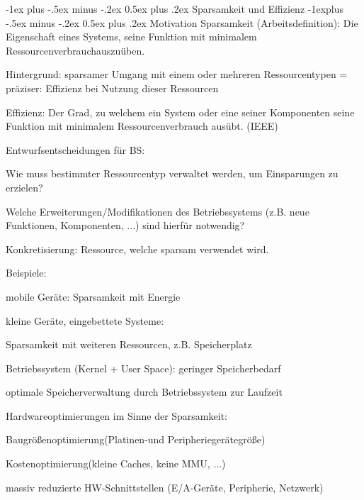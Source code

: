 \documentclass[a4paper]{article}
\makeatletter
\renewcommand{\section}{\@startsection{section}{1}{0mm}%
 {-1ex plus -.5ex minus -.2ex}%
 {0.5ex plus .2ex}%
 {\normalfont\large\bfseries}}
\renewcommand{\subsection}{\@startsection{subsection}{2}{0mm}%
 {-1explus -.5ex minus -.2ex}%
 {0.5ex plus .2ex}%
 {\normalfont\normalsize\bfseries}}
\makeatother
\begin{document}
\begin{multicols}{3}
    \section{Sparsamkeit und Effizienz}
    \subsection{Motivation}
    Sparsamkeit (Arbeitsdefinition): Die Eigenschaft eines Systems, seine
    Funktion mit minimalem Ressourcenverbrauchauszuüben.

    Hintergrund: sparsamer Umgang mit einem oder mehreren Ressourcentypen =
    präziser: Effizienz bei Nutzung dieser Ressourcen

    Effizienz: Der Grad, zu welchem ein System oder eine seiner Komponenten
    seine Funktion mit minimalem Ressourcenverbrauch ausübt. (IEEE)

    Entwurfsentscheidungen für BS:

    \begin{enumerate*}
        \item
        Wie muss bestimmter Ressourcentyp verwaltet werden, um Einsparungen zu
        erzielen?
        \item
        Welche Erweiterungen/Modifikationen des Betriebssystems (z.B. neue
        Funktionen, Komponenten, ...) sind hierfür notwendig?
    \end{enumerate*}

    Konkretisierung: Ressource, welche sparsam verwendet wird.

    Beispiele:

    \begin{itemize*}
        \item
        mobile Geräte: Sparsamkeit mit Energie
        \item
        kleine Geräte, eingebettete Systeme:
        \begin{itemize*}
            \item Sparsamkeit mit weiteren Ressourcen, z.B. Speicherplatz
            \item Betriebssystem (Kernel + User Space): geringer Speicherbedarf
            \item optimale Speicherverwaltung durch Betriebssystem zur Laufzeit
        \end{itemize*}
        \item
        Hardwareoptimierungen im Sinne der Sparsamkeit:
        \begin{itemize*}
            \item Baugrößenoptimierung(Platinen-und Peripheriegerätegröße)
            \item Kostenoptimierung(kleine Caches, keine MMU, ...)
            \item massiv reduzierte HW-Schnittstellen (E/A-Geräte, Peripherie, Netzwerk)
        \end{itemize*}
    \end{itemize*}


\end{multicols}
\end{document}
